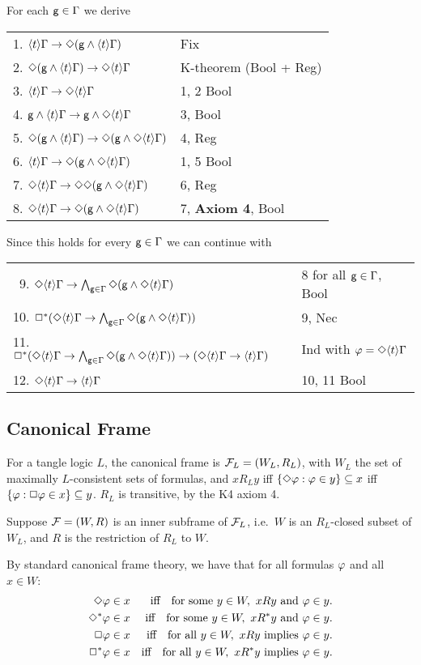 For each ${\sf g}\in\Gamma$ we derive

\bigskip
\begin{tabular}{ll}
1. $\langle t\rangle\Gamma\to  \Diamond({\sf g}\land\langle t\rangle\Gamma)$   & Fix
\\
2. $ \Diamond({\sf g}\land\langle t\rangle\Gamma)\to \Diamond\langle t\rangle\Gamma$  &K-theorem (Bool + Reg)
\\
3. $\langle t\rangle\Gamma\to \Diamond\langle t\rangle\Gamma$  &1, 2 Bool
\\
4. ${\sf g}\land\langle t\rangle\Gamma\to{\sf g}\land \Diamond\langle t\rangle\Gamma$  &3, Bool
\\
5. $\Diamond({\sf g}\land\langle t\rangle\Gamma)\to\Diamond({\sf g}\land \Diamond\langle t\rangle\Gamma)$  &4, Reg
\\
6. $\langle t\rangle\Gamma\to \Diamond({\sf g}\land \Diamond\langle t\rangle\Gamma)$  &1, 5 Bool
\\
7.  $\Diamond\langle t\rangle\Gamma\to \Diamond\Diamond({\sf g}\land \Diamond\langle t\rangle\Gamma)$  &6, Reg
\\
8. $\Diamond\langle t\rangle\Gamma\to\Diamond({\sf g}\land \Diamond\langle t\rangle\Gamma)$ &7, \textbf{Axiom 4}, Bool
\end{tabular}

\bigskip\noindent
Since this holds for every ${\sf g}\in\Gamma$ we can continue with

\bigskip
\begin{tabular}{ll}
\, 9. $\Diamond\langle t\rangle\Gamma\to \bigwedge_{{\sf g}\in\Gamma}\Diamond({\sf g}\land \Diamond\langle t\rangle\Gamma)$ &8 for all ${\sf g}\in\Gamma$, Bool
\\
10. $\Box^*(\Diamond\langle t\rangle\Gamma\to\bigwedge_{{\sf g}\in\Gamma}\Diamond({\sf g}\land \Diamond\langle t\rangle\Gamma))$ &9, Nec
\\
11. $\Box^*(\Diamond\langle t\rangle\Gamma\to\bigwedge_{{\sf g}\in\Gamma}\Diamond({\sf g}\land \Diamond\langle t\rangle\Gamma))\to (\Diamond\langle t\rangle\Gamma\to\langle t\rangle\Gamma)$ & Ind with $\varphi=\Diamond\langle t\rangle\Gamma$
\\
12. $\Diamond\langle t\rangle\Gamma\to\langle t\rangle\Gamma$ &10, 11 Bool
\end{tabular}



\subsection{Canonical Frame}\label{ss:can frame}
For a tangle logic $L$, the canonical frame is 
 $\mathcal{F}_L=(W_L,R_L)$, with $W_L$ the set of maximally $L$-consistent sets of formulas, and $xR_Ly$ iff $\{\Diamond\varphi:\varphi\in y\}\subseteq x$ iff $\{\varphi:\Box\varphi\in x\}\subseteq y$. $R_L$ is transitive, by the K4 axiom 4.

Suppose $\mathcal{F}=(W,R)$ is an inner subframe of $\mathcal{F}_L$, i.e.\  $W$ is an $R_L$-closed subset of $W_L$,  and $R$ is the restriction of $R_L$ to $W$.

By standard canonical frame theory,  we have that for all formulas $\varphi$ and all $x\in W$:
\begin{eqnarray}
\Dim\ph\in x &&\text{iff\quad for some } y\in W, \ xRy \text{ and }\ph\in y.  \label{Dican}
\\
\Dim^*\ph\in x &&\text{iff\quad for some } y\in W, \ xR^*y \text{ and }\ph\in y.  \label{Distar}
\\
\label{Boxcan}
\Box\ph\in x &&\text{iff\quad  for all } y\in W, \ xRy \text{ implies }\ph\in y.
\\
\label{Boxstar}
\Box^*\ph\in x &&\text{iff\quad for all } y\in W, \ xR^*y \text{ implies }\ph\in y.
\end{eqnarray}

